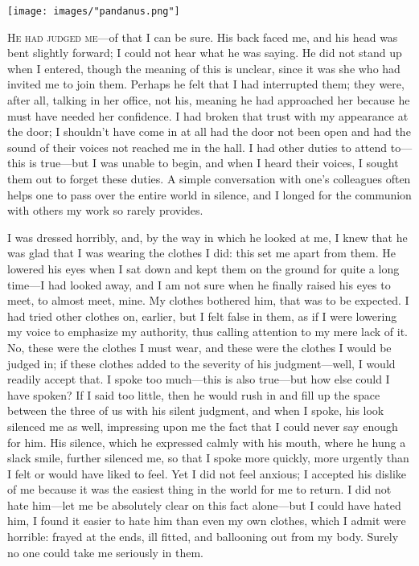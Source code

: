 \documentclass[
]{memoir}
\begin{document}
\begin{center}\texttt{[image: images/"pandanus.png"]}\end{center}

\lettrine[lines=3, findent=0em, nindent=0.1em, lhang=0]{H}{e had judged me}---of
that I can be sure. His back faced me, and his head was bent slightly
forward; I could not hear what he was saying. He did not stand up when I
entered, though the meaning of this is unclear, since it was she who had
invited me to join them. Perhaps he felt that I had interrupted them;
they were, after all, talking in her office, not his, meaning he had
approached her because he must have needed her confidence. I had broken
that trust with my appearance at the door; I shouldn't have come in at
all had the door not been open and had the sound of their voices not
reached me in the hall. I had other duties to attend to---this is
true---but I was unable to begin, and when I heard their voices, I
sought them out to forget these duties. A simple conversation with one's
colleagues often helps one to pass over the entire world in silence, and
I longed for the communion with others my work so rarely provides.

I was dressed horribly, and, by the way in which he looked at me, I knew
that he was glad that I was wearing the clothes I did: this set me apart
from them. He lowered his eyes when I sat down and kept them on the
ground for quite a long time---I had looked away, and I am not sure when
he finally raised his eyes to meet, to almost meet, mine. My clothes
bothered him, that was to be expected. I had tried other clothes on,
earlier, but I felt false in them, as if I were lowering my voice to
emphasize my authority, thus calling attention to my mere lack of it.
No, these were the clothes I must wear, and these were the clothes I
would be judged in; if these clothes added to the severity of his
judgment---well, I would readily accept that. I spoke too much---this is
also true---but how else could I have spoken? If I said too little, then
he would rush in and fill up the space between the three of us with his
silent judgment, and when I spoke, his look silenced me as well,
impressing upon me the fact that I could never say enough for him. His
silence, which he expressed calmly with his mouth, where he hung a slack
smile, further silenced me, so that I spoke more quickly, more urgently
than I felt or would have liked to feel. Yet I did not feel anxious; I
accepted his dislike of me because it was the easiest thing in the world
for me to return. I did not hate him---let me be absolutely clear on
this fact alone---but I could have hated him, I found it easier to hate
him than even my own clothes, which I admit were horrible: frayed at the
ends, ill fitted, and ballooning out from my body. Surely no one could
take me seriously in them.
\end{document}
